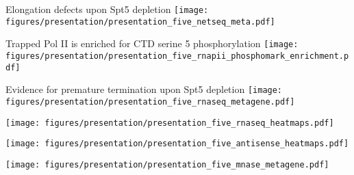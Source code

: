 \documentclass[aspectratio=169, 12pt]{beamer}
\begin{document}
\begin{frame}{Elongation defects upon Spt5 depletion}
    \centering
    \texttt{[image: figures/presentation/presentation\_five\_netseq\_meta.pdf]}
\end{frame}

\begin{frame}{Trapped Pol II is enriched for CTD serine 5 phosphorylation}
    \texttt{[image: figures/presentation/presentation\_five\_rnapii\_phosphomark\_enrichment.pdf]}
\end{frame}

\begin{frame}{Evidence for premature termination upon Spt5 depletion}
    \centering
    \texttt{[image: figures/presentation/presentation\_five\_rnaseq\_metagene.pdf]}
\end{frame}

\begin{frame}[t]
    \centering
    \texttt{[image: figures/presentation/presentation\_five\_rnaseq\_heatmaps.pdf]}
\end{frame}

\begin{frame}[t]
    \texttt{[image: figures/presentation/presentation\_five\_antisense\_heatmaps.pdf]}
\end{frame}

\begin{frame}[t]
    \texttt{[image: figures/presentation/presentation\_five\_mnase\_metagene.pdf]}
\end{frame}
\end{document}
